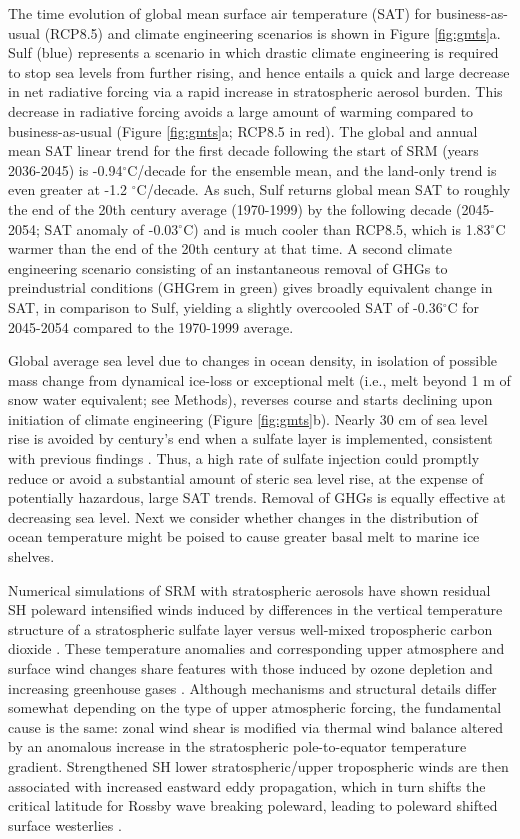 \documentclass{nature}
\begin{document}
The time evolution of global mean surface air temperature (SAT) for business-as-usual (RCP8.5) and climate engineering scenarios is shown in Figure \ref{fig:gmts}a. Sulf (blue) represents a scenario in which drastic climate engineering is required to stop sea levels from further rising, and hence entails a quick and large decrease in net radiative forcing via a rapid increase in stratospheric aerosol burden. This decrease in radiative forcing avoids a large amount of warming compared to business-as-usual (Figure \ref{fig:gmts}a; RCP8.5 in red). The global and annual mean SAT linear trend for the first decade following the start of SRM (years 2036-2045) is -0.94$^\circ$C/decade for the ensemble mean, and the land-only trend is even greater at -1.2 $^\circ$C/decade. As such, Sulf returns global mean SAT to roughly the end of the 20th century average (1970-1999) by the following decade (2045-2054; SAT anomaly of -0.03$^\circ$C) and is much cooler than RCP8.5, which is 1.83$^\circ$C warmer than the end of the 20th century at that time. A second climate engineering scenario consisting of an instantaneous removal of GHGs to preindustrial conditions (GHGrem in green) gives broadly equivalent change in SAT, in comparison to Sulf, yielding a slightly overcooled SAT of -0.36$^\circ$C for 2045-2054 compared to the 1970-1999 average. 

Global average sea level due to changes in ocean density, in isolation of possible mass change from dynamical ice-loss or exceptional melt (i.e., melt beyond 1 m of snow water equivalent; see Methods), reverses course and starts declining upon initiation of climate engineering (Figure \ref{fig:gmts}b). Nearly 30 cm of sea level rise is avoided by century's end when a sulfate layer is implemented, consistent with previous findings \cite{irvine12}. Thus, a high rate of sulfate injection could promptly reduce or avoid a substantial amount of steric sea level rise, at the expense of potentially hazardous, large SAT trends. Removal of GHGs is equally effective at decreasing sea level. Next we consider whether changes in the distribution of ocean temperature might be poised to cause greater basal melt to marine ice shelves. 

Numerical simulations of SRM with stratospheric aerosols have shown residual SH poleward intensified winds induced by differences in the vertical temperature structure of a stratospheric sulfate layer versus well-mixed tropospheric carbon dioxide \cite{ammann10,mccusker12}. These temperature anomalies and corresponding upper atmosphere and surface wind changes share features with those induced by ozone depletion \cite{gillett03,gillett13,sigmond11,thompson11} and increasing greenhouse gases \cite{gillett13,sigmond11,polvani11}. Although mechanisms and structural details differ somewhat depending on the type of upper atmospheric forcing, the fundamental cause is the same: zonal wind shear is modified via thermal wind balance altered by an anomalous increase in the stratospheric pole-to-equator temperature gradient. Strengthened SH lower stratospheric/upper tropospheric winds are then associated with increased eastward eddy propagation, which in turn shifts the critical latitude for Rossby wave breaking poleward, leading to poleward shifted surface westerlies \cite{chen07}.
\end{document}
